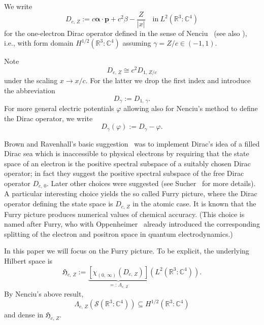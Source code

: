 \documentclass[10pt]{amsart}
\theoremstyle{definition}
\newcommand*\cz{\mathbb{C}}
\newcommand*\rz{\mathbb{R}}
\newcommand*\cS{\mathcal{S}}
\newcommand*\gH{\mathfrak{H}}
\newcommand*\balpha{\bm{\alpha}}
\newcommand*\bp{\bm{p}}
\begin{document}
We write
\begin{equation}\label{eq:defcoulombdirac}
D_{c,\,Z}:= c\balpha\cdot \bp+c^2\beta-\frac{Z}{|x|} \quad \text{in}\ L^2\left(\rz^3:\cz^4\right)
\end{equation}
for the one-electron Dirac operator defined in the sense of Nenciu~\cite{Nenciu1976} (see also \cite{KlausWust1978,Schmincke1972,Wust1975}), i.e., with form domain $H^{1/2}(\rz^3:\cz^4)$ assuming $\gamma=Z/c\in(-1,1)$.

Note
\begin{equation}\label{eq:cdrescaled}
D_{c,\,Z}\cong c^2D_{1,\,Z/c}
\end{equation}
under the scaling $x\to x/c$. For the latter we drop the first index and introduce the abbreviation
\begin{equation}\label{eq:dgamma}
D_\gamma:=D_{1,\,\gamma}.
\end{equation}
For more general electric potentials $\varphi$ allowing also for Nenciu's method to define the Dirac operator, we write
\begin{equation}\label{eq:dphi}
D_\gamma(\varphi):=D_\gamma-\varphi.
\end{equation}

Brown and Ravenhall's basic suggestion~\cite{BrownRavenhall1951} was to implement Dirac's idea \cite{Dirac1930A} of a filled Dirac sea which is inaccessible to physical electrons by requiring that the state space of an electron is the positive spectral subspace of a suitably chosen Dirac operator; in fact they suggest the positive spectral subspace of the free Dirac operator $D_{c,\,0}$. Later other choices were suggested (see Sucher~\cite{Sucher1980} for more details). A particular interesting choice yields the so called Furry picture, where the Dirac operator defining the state space is $D_{c,\,Z}$ in the atomic case. It is known that the Furry picture produces numerical values of chemical accuracy. (This choice is named after Furry, who with Oppenheimer~\cite{FurryOppenheimer1934} already introduced the corresponding splitting of the electron and positron space in quantum electrodynamics.)

In this paper we will focus on the Furry picture. To be explicit, the underlying Hilbert space is
\[
\gH_{c,\,Z}:=\underbrace{\left[\chi_{(0,\,\infty)}(D_{c,\,Z})\right]}_{=:\,\Lambda_{c,\,Z}}\left(L^2\left(\rz^3:\cz^4\right)\right).
\]
By Nenciu's above result,
\[
\Lambda_{c,\,Z}\left(\cS\left(\rz^3:\cz^4\right)\right)\subseteq H^{1/2}\left(\rz^3:\cz^4\right)
\]
and dense in $\gH_{c,\,Z}$.
\end{document}
